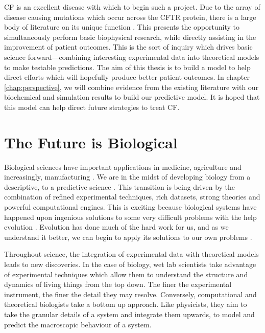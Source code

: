 CF is an excellent disease with which to begin such a project. Due to the array of disease causing mutations which occur across the CFTR protein, there is a large body of literature on its unique function \cite{csanady2019a}. This presents the opportunity to simultaneously perform basic biophysical research, while directly assisting in the improvement of patient outcomes. This is the sort of inquiry which drives basic science forward---combining interesting experimental data into theoretical models to make testable predictions. The aim of this thesis is to build a model to help direct efforts which will hopefully produce better patient outcomes. In chapter \ref{chap:perspective}, we will combine evidence from the existing literature with our biochemical and simulation results to build our predictive model. It is hoped that this model can help direct future strategies to treat CF.


\section{The Future is Biological}
Biological sciences have important applications in medicine, agriculture and increasingly, manufacturing \cite{anonymous2019, scown2022}. We are in the midst of developing biology from a descriptive, to a predictive science \cite{kochanski1973,liu2005, mogilner2016, covert2021, jumper2021}. This transition is being driven by the combination of refined experimental techniques, rich datasets, strong theories and powerful computational engines. This is exciting because biological systems have happened upon ingenious solutions to some very difficult problems with the help evolution \cite{dawkins1989, dawkins2016}. Evolution has done much of the hard work for us, and as we understand it better, we can begin to apply its solutions to our own problems \cite{benyus2009, wang2021a, arnold2018}.

Throughout science, the integration of experimental data with theoretical models leads to new discoveries. In the case of biology, wet lab scientists take advantage of experimental techniques which allow them to understand the structure and dynamics of living things from the top down. The finer the experimental instrument, the finer the detail they may resolve. Conversely, computational and theoretical biologists take a bottom up approach. Like physicists, they aim to take the granular details of a system and integrate them upwards, to model and predict the macroscopic behaviour of a system. 

